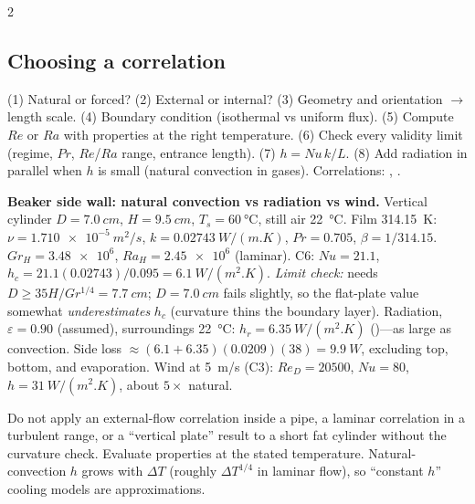 \begin{multicols}{2}
\subsection{Choosing a correlation}\label{sec:corrchoice}
\begin{keybox}(1) Natural or forced? (2) External or internal? (3) Geometry and orientation $\to$ length scale. (4) Boundary condition (isothermal vs uniform flux). (5) Compute $Re$ or $Ra$ with properties at the right temperature. (6) Check every validity limit (regime, $Pr$, $Re$/$Ra$ range, entrance length). (7) $h=Nu\,k/L$. (8) Add radiation in parallel when $h$ is small (natural convection in gases). Correlations: , .\end{keybox}
\begin{demobox}\textbf{Beaker side wall: natural convection vs radiation vs wind.} Vertical cylinder $D=\SI{7.0}{cm}$, $H=\SI{9.5}{cm}$, $T_s=\SI{60}{\celsius}$, still air \SI{22}{\celsius}. Film \SI{314.15}{K}: $\nu=\SI{1.710e-5}{m^2/s}$, $k=\SI{0.02743}{W/(m.K)}$, $Pr=0.705$, $\beta=1/314.15$.
$Gr_H=\num{3.48e6}$, $Ra_H=\num{2.45e6}$ (laminar). C6: $Nu=21.1$, $h_c=21.1(0.02743)/0.095=\SI{6.1}{W/(m^2.K)}$.
\emph{Limit check:} needs $D\ge35H/Gr^{1/4}=\SI{7.7}{cm}$; $D=\SI{7.0}{cm}$ fails slightly, so the flat-plate value somewhat \emph{underestimates} $h_c$ (curvature thins the boundary layer).
Radiation, $\varepsilon=0.90$ (assumed), surroundings \SI{22}{\celsius}: $h_r=\SI{6.35}{W/(m^2.K)}$ ()---as large as convection. Side loss $\approx(6.1+6.35)(0.0209)(38)=\SI{9.9}{W}$, excluding top, bottom, and evaporation.
Wind at \SI{5}{m/s} (C3): $Re_D=\num{20500}$, $Nu=80$, $h=\SI{31}{W/(m^2.K)}$, about $5\times$ natural.\end{demobox}

\begin{trapbox}Do not apply an external-flow correlation inside a pipe, a laminar correlation in a turbulent range, or a ``vertical plate'' result to a short fat cylinder without the curvature check. Evaluate properties at the stated temperature. Natural-convection $h$ grows with $\Delta T$ (roughly $\Delta T^{1/4}$ in laminar flow), so ``constant $h$'' cooling models are approximations.\end{trapbox}
\end{multicols}

